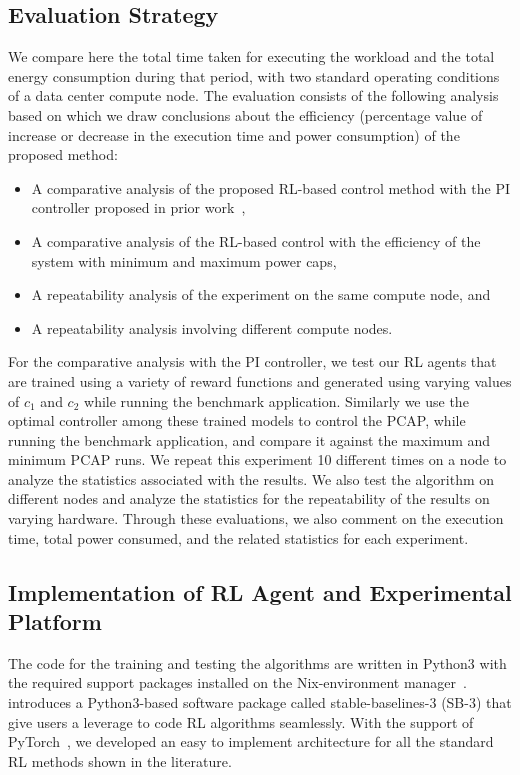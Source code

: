 \subsection{Evaluation Strategy} \label{subsec:evaluation_steps}
We compare here the total time taken for executing the workload and the total energy consumption during that period, with two standard operating conditions of a data center compute node. The evaluation consists of the following analysis based on which we draw conclusions about the efficiency (percentage value of increase or decrease in the execution time and power consumption) of the proposed method: 
\begin{itemize}
\item A comparative analysis of the proposed RL-based control method with the PI controller proposed in prior work~\cite{cerf2021sustaining},
\item A comparative analysis of the RL-based control with the efficiency of the system with minimum and maximum power caps,
\item A repeatability analysis of the experiment on the same compute node, and
\item A repeatability analysis involving different compute nodes.
\end{itemize}
For the comparative analysis with the PI controller, we test our RL agents that are trained using a variety of reward functions and generated using varying values of $c_1$ and $c_2$ while running the benchmark application. Similarly we use the optimal controller among these trained models to control the PCAP, while running the benchmark application, and compare it against the maximum and minimum PCAP runs. We repeat this experiment 10 different times on a node to analyze the statistics associated with the results. We also test the algorithm on different nodes and analyze the statistics for the repeatability of the results on varying hardware.
Through these evaluations, we also comment on the execution time, total power consumed, and the related statistics for each experiment. 

\subsection{Implementation of RL Agent and Experimental Platform}\label{sec:platform}
The code for the training and testing the algorithms are written in Python3 with the required support packages installed on the Nix-environment manager~\cite{dolstra2008nixos}. ~\cite{raffin2021stable} introduces a Python3-based software package called stable-baselines-3 (SB-3) that give users a leverage to code RL algorithms seamlessly. With the support of PyTorch~\cite{paszke2019pytorch}, we developed an easy to implement architecture for all the standard RL methods shown in the literature.

